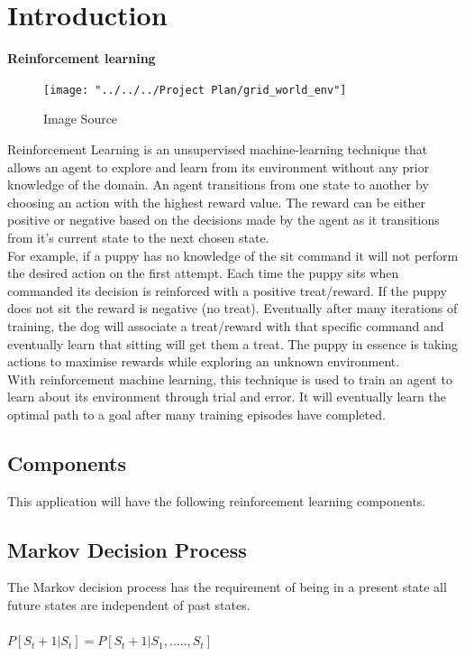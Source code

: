 \chapter{Introduction}
\textbf{Reinforcement learning}\\
\begin{figure}[H]
	\centering
	\texttt{[image: "../../../Project Plan/grid\_world\_env"]}
	\caption{Image Source~\cite{GridWorl45:online}}
	\label{fig:gridworldenv}

\end{figure}
Reinforcement Learning is an unsupervised machine-learning technique that allows an agent to explore and learn from its environment without any prior knowledge of the domain. 
An agent transitions from one state to another by choosing an action with the highest reward value. The reward can be either positive or negative based on the decisions made by the agent as it transitions from it's current state to the next chosen state.\\
For example, if a puppy has no knowledge of the sit command it will not perform the desired action on the first attempt. Each time the puppy sits when commanded its decision is reinforced with a positive treat/reward. If the puppy does not sit the reward is negative (no treat). Eventually after many iterations of training, the dog will associate a treat/reward with that specific command and eventually learn that sitting will get them a treat. 
The puppy in essence is taking actions to maximise rewards while exploring an unknown environment.\\
With reinforcement machine learning, this technique is used to train an agent to learn about its environment through trial and error. It will eventually learn the optimal path to a goal after many training episodes have completed.

\section{Components}
This application will have the following reinforcement learning components.

\section{Markov Decision Process}
The Markov decision process has the requirement of being in a present state all future states are independent of past states.\\\\
$P[S_{t}+1 | S_{t}] = P[S_{t}+1 | S_{1}, ..... , S_{t}]$\\\\


